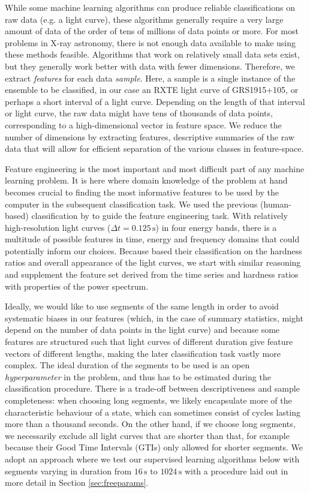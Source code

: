 \documentclass[12pt]{emulateapj}
\begin{document}
While some machine learning algorithms can produce reliable classifications on raw data (e.g. a light curve), these algorithms generally require a very large amount of data of the order of tens of millions of data points or more. 
For most problems in X-ray astronomy, there is not enough data available to make using these methods feasible. Algorithms that work on relatively small data sets exist, but they generally work better with data with fewer dimensions. Therefore, we extract \textit{features} for each data \textit{sample}. 
Here, a sample is a single instance of the ensemble to be classified, in our case an RXTE light curve of GRS1915+105, or perhaps a short interval of a light curve. Depending on the length of that interval or light curve, the raw data might have tens of thousands of data points, corresponding to a high-dimensional vector in feature space. We reduce the number of dimensions by extracting features, descriptive summaries of the raw data that will allow for efficient separation of the various classes in feature-space. 

Feature engineering is the most important and most difficult part of any machine learning problem. It is here where domain knowledge of the problem at hand becomes crucial to finding the most informative features to be used by the computer in the subsequent classification task. 
We used the previous (human-based) classification by \citet{belloni2000} to guide the feature engineering task. With relatively high-resolution light curves ($\Delta t = 0.125 \,\mathrm{s}$) in four energy bands, there is a multitude of possible features in time, energy and frequency domains that could potentially inform our choices. Because \citet{belloni2000} based their classification on the hardness ratios and overall appearance of the light curves, we start with similar reasoning and supplement the feature set derived from the time series and hardness ratios with properties of the power spectrum. 

Ideally, we would like to use segments of the same length in order to avoid systematic biases in our features (which, in the case of summary statistics, might depend on the number of data points in the light curve) and because some features are structured such that light curves of different duration give feature vectors of different lengths, making the later classification task vastly more complex. The ideal duration of the segments to be used is an open \textit{hyperparameter} in the problem, and thus has to be estimated during the classification procedure. There is a trade-off between descriptiveness and sample completeness: when choosing long segments, we likely encapsulate more of the characteristic behaviour of a state, which can sometimes consist of cycles lasting more than a thousand seconds. On the other hand, if we choose long segments, we necessarily exclude all light curves that are shorter than that, for example because their Good Time Intervals (GTIs) only allowed for shorter segments. We adopt an approach where we test our supervised learning algorithms below with segments varying in duration from $16\,\mathrm{s}$ to $1024\,\mathrm{s}$ with a procedure laid out in more detail in Section \ref{sec:freeparams}.
\end{document}
